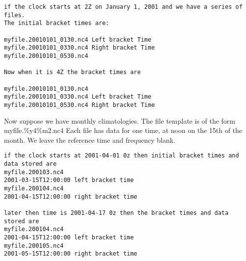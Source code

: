\begin{verbatim}
if the clock starts at 2Z on January 1, 2001 and we have a series of files.
The initial bracket times are:

myfile.20010101_0130.nc4 Left bracket Time
myfile.20010101_0330.nc4 Right bracket Time
myfile.20010101_0530.nc4

Now when it is 4Z the bracket times are

myfile.20010101_0130.nc4
myfile.20010101_0330.nc4 Left bracket Time
myfile.20010101_0530.nc4 Right bracket Time

\end{verbatim}

Now suppose we have monthly climatologies. The file template is of the form
myfile.\%y4\%m2.nc4
Each file has data for one time, at noon on the 15th of the month. We leave the
reference time and frequency blank.

\begin{verbatim}
if the clock starts at 2001-04-01 0z then initial bracket times and data stored are 
myfile.200103.nc4
2001-03-15T12:00:00 left bracket time
myfile.200104.nc4
2001-04-15T12:00:00 right bracket time

later then time is 2001-04-17 0z then the bracket times and data stored are
myfile.200104.nc4
2001-04-15T12:00:00 left bracket time
myfile.200105.nc4
2001-05-15T12:00:00 right bracket time

\end{verbatim}
